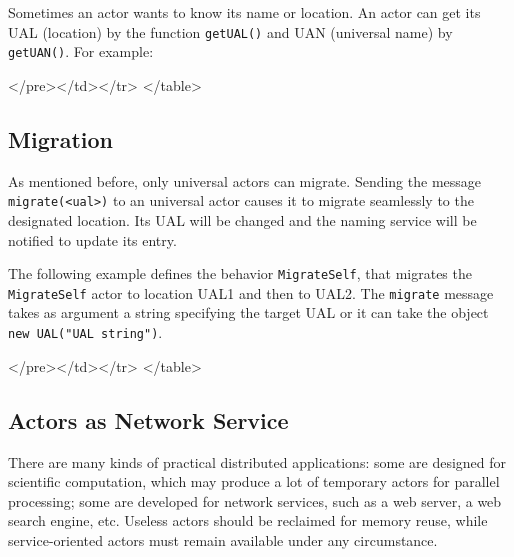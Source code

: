 Sometimes an actor wants to know its name or location. An actor can get its 
UAL (location) by the function {\tt getUAL()} and UAN (universal name) by 
{\tt getUAN()}. For example:
{\singlespace

}
\begin{htmlonly}

 \begin{rawhtml} 
   </pre></td></tr>
  </table>
\end{rawhtml} 
\end{htmlonly}


\subsection{Migration}
As mentioned before, only universal actors can migrate. 
Sending the message {\tt migrate({\textless}ual{\textgreater})} to an universal actor causes it to migrate 
seamlessly to the designated location. Its UAL will be changed and the 
naming service will be notified to update its entry. 

The following example defines the behavior {\tt MigrateSelf}, 
that migrates the {\tt MigrateSelf} actor to location UAL1 and 
then to UAL2. The {\tt migrate} message takes as argument a 
string specifying the target UAL or it can take the object 
{\tt new UAL("UAL string")}.
{\singlespace

}
\begin{htmlonly}

 \begin{rawhtml} 
   </pre></td></tr>
  </table>
\end{rawhtml} 
\end{htmlonly}
 
\subsection{Actors as Network Service} \label{ServiceActor}
There are many kinds of practical distributed applications: some are 
designed for scientific computation, which
may produce a lot of temporary actors for parallel processing; 
some are developed for network services, such as a web server, a web search 
engine, etc. Useless actors should be reclaimed for memory reuse, 
while service-oriented actors must remain available under any circumstance.

